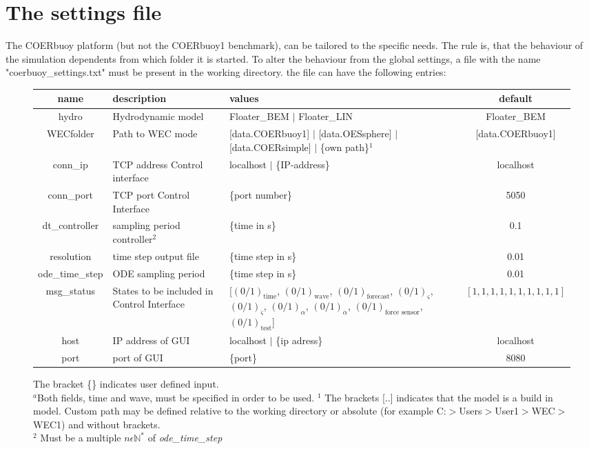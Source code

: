 \documentclass[oneside,10pt,a4paper]{book}
\begin{document}
\section{The settings file}\label{sec:settings}
The COERbuoy platform (but not the COERbuoy1 benchmark), can be tailored to the specific needs. The rule is, that the behaviour of the simulation dependents from which folder it is started. To alter the behaviour from the global settings, a file with the name "coerbuoy\_settings.txt" must be present in the working directory. the file can have the following entries:
\begin{figure}[h!]\label{tab:param_settings}
	\begin{tabular}{|c|p{3cm}|p{6cm}|c|}
		\hline
		name & description & values & default \\
		\hline
		hydro&Hydrodynamic model& Floater\_BEM $\vert$ Floater\_LIN & Floater\_BEM \\
		\hline
		WECfolder&Path to WEC mode&[data.COERbuoy1] $\vert$ [data.OESsphere] $\vert$ [data.COERsimple] $\vert$ \{own path\}$^1$&[data.COERbuoy1]\\
		\hline
		conn\_ip&TCP address Control interface&localhost $\vert$ \{IP-address\}&localhost\\
		\hline
		conn\_port&TCP port Control Interface&\{port number\}&5050\\
		\hline
		dt\_controller&sampling period controller$^2$&\{time in s\}&0.1\\
		\hline
		resolution&time step output file&\{time step in s\}&0.01\\
		\hline
		ode\_time\_step&ODE sampling period&\{time step in s\}&0.01\\
		\hline
		msg\_status&States to be included in Control Interface&[$(0/1)_\text{time}$, $(0/1)_\text{wave}$, $(0/1)_\text{forecast}$, $(0/1)_{ \varsigma }$, $(0/1)_{\dot{\varsigma}}$, $(0/1)_\alpha$, $(0/1)_{\dot{\alpha}}$, $(0/1)_{\text{force sensor}}$, $(0/1)_{\text{test}}$]&$[1,1,1,1,1,1,1,1,1,1]$\\
			\hline
		host&IP address of GUI&localhost $\vert$ \{ip adress\}&localhost\\
		\hline
		port&port of GUI&\{port\}&8080\\
		\hline
	\end{tabular}
	\caption{The bracket \{\} indicates user defined input.\\$^a$Both fields, time and wave, must be specified in order to be used.
		$^1$ The brackets [..] indicates that the model is a build in model. Custom path may be defined relative to the working directory or absolute (for example C:$>$Users$>$User1$>$WEC$>$WEC1) and without brackets.\\
	$^2$ Must be a multiple $n\epsilon\mathbb{N}^*$ of \textit{ode\_time\_step}}
	\end{figure}
	
\end{document}
